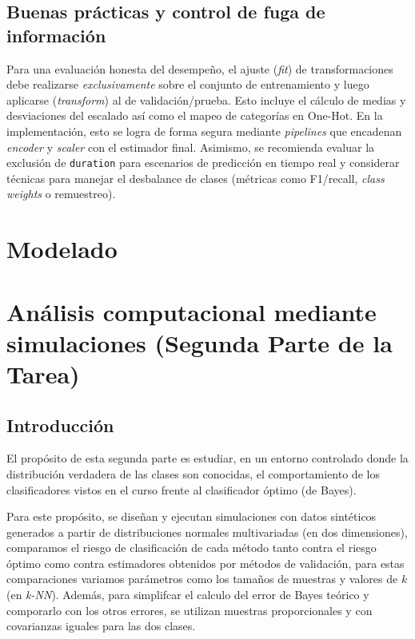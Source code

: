 \documentclass[10pt]{article}
\begin{document}
\subsection*{Buenas prácticas y control de fuga de información}
Para una evaluación honesta del desempeño, el ajuste (\emph{fit}) de transformaciones debe realizarse \emph{exclusivamente} sobre el conjunto de entrenamiento y luego aplicarse (\emph{transform}) al de validación/prueba. Esto incluye el cálculo de medias y desviaciones del escalado así como el mapeo de categorías en One-Hot. En la implementación, esto se logra de forma segura mediante \emph{pipelines} que encadenan \textit{encoder} y \textit{scaler} con el estimador final. Asimismo, se recomienda evaluar la exclusión de \texttt{duration} para escenarios de predicción en tiempo real y considerar técnicas para manejar el desbalance de clases (métricas como F1/recall, \emph{class weights} o remuestreo).






\section{Modelado}

\newpage

\section{Análisis computacional mediante simulaciones (Segunda Parte de la Tarea)}

\subsection*{Introducción}

El propósito de esta segunda parte es estudiar, en un entorno controlado donde
la distribución verdadera de las clases son conocidas, el comportamiento de los
clasificadores vistos en el curso frente al clasificador óptimo (de Bayes).

Para este propósito, se diseñan y ejecutan simulaciones con datos sintéticos
generados a partir de distribuciones normales multivariadas (en dos
dimensiones), comparamos el riesgo de clasificación de cada método tanto contra
el riesgo óptimo como contra estimadores obtenidos por métodos de validación, 
para estas comparaciones variamos parámetros como los tamaños de muestras y
valores de $k$ (en \textit{k-NN}). Además, para simplifcar el calculo del error
de Bayes teórico y comporarlo con los otros errores, se utilizan muestras
proporcionales y con covarianzas iguales para las dos clases.
\end{document}
